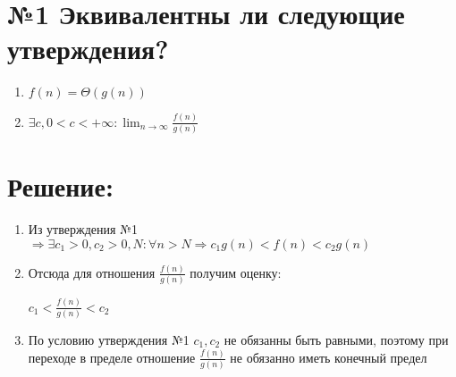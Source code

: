 
\section*{№1 Эквивалентны ли следующие утверждения?}

\begin{enumerate}
	\item $f(n) = \Theta(g(n))$
	\item $\exists c, 0 < c< +\infty: \lim _{n \to \infty}\frac{f(n)}{g(n)}  $
\end{enumerate}
\section*{Решение:}

\begin{enumerate}
\item Из утверждения №1 $\Rightarrow \exists c_1>0, c_2>0, N: \forall n>N \Rightarrow c_1g(n)<f(n)<c_2g(n) $

\item Отсюда для отношения $\frac{f(n)}{g(n)}$ получим оценку:

  $ c_1<\frac{f(n)}{g(n)}< c_2$

\item По условию утверждения №1  $  c_1 , c_2 $ не обязанны быть равными, поэтому при переходе в пределе отношение $\frac{f(n)}{g(n)}$ не обязанно иметь конечный предел


\end{enumerate}